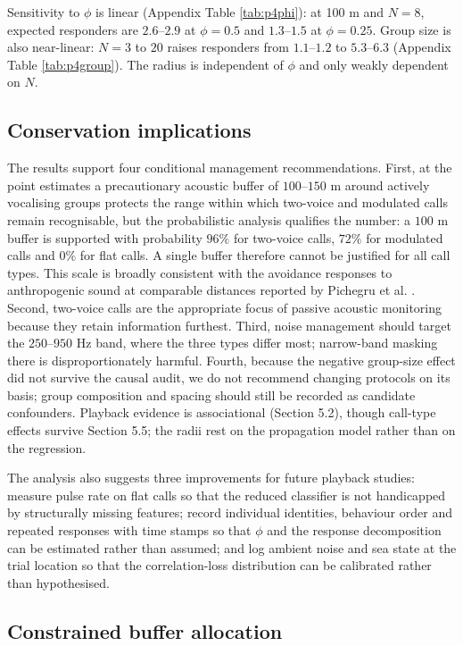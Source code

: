 \documentclass{apmcmthesis}
\begin{document}
Sensitivity to $\phi$ is linear (Appendix Table \ref{tab:p4phi}): at 100 m and $N=8$, expected responders are $2.6$--$2.9$ at $\phi=0.5$ and $1.3$--$1.5$ at $\phi=0.25$. Group size is also near-linear: $N=3$ to $20$ raises responders from $1.1$--$1.2$ to $5.3$--$6.3$ (Appendix Table \ref{tab:p4group}). The radius is independent of $\phi$ and only weakly dependent on $N$.

\subsection{Conservation implications}

The results support four conditional management recommendations. First, at the point estimates a precautionary acoustic buffer of $100$--$150$ m around actively vocalising groups protects the range within which two-voice and modulated calls remain recognisable, but the probabilistic analysis qualifies the number: a $100$ m buffer is supported with probability $96\%$ for two-voice calls, $72\%$ for modulated calls and $0\%$ for flat calls. A single buffer therefore cannot be justified for all call types. This scale is broadly consistent with the avoidance responses to anthropogenic sound at comparable distances reported by Pichegru et al. \cite{pichegru2017}. Second, two-voice calls are the appropriate focus of passive acoustic monitoring because they retain information furthest. Third, noise management should target the $250$--$950$ Hz band, where the three types differ most; narrow-band masking there is disproportionately harmful. Fourth, because the negative group-size effect did not survive the causal audit, we do not recommend changing protocols on its basis; group composition and spacing should still be recorded as candidate confounders. Playback evidence is associational (Section 5.2), though call-type effects survive Section 5.5; the radii rest on the propagation model rather than on the regression.

The analysis also suggests three improvements for future playback studies: measure pulse rate on flat calls so that the reduced classifier is not handicapped by structurally missing features; record individual identities, behaviour order and repeated responses with time stamps so that $\phi$ and the response decomposition can be estimated rather than assumed; and log ambient noise and sea state at the trial location so that the correlation-loss distribution can be calibrated rather than hypothesised.

\subsection{Constrained buffer allocation}
\end{document}
